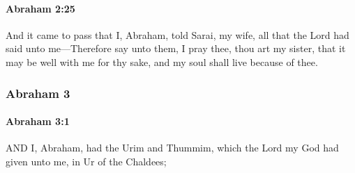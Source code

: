 		\paragraph{Abraham 2:25} %
			\label{ABRAHAM-2-25}

			And it came to pass that I, Abraham, told Sarai, my wife, all that the Lord had said unto me—Therefore say unto them, I pray thee, thou art my sister, that it may be well with me for thy sake, and my soul shall live because of thee.

		
	\subsubsection{Abraham 3} %
		\label{ABRAHAM-3}
		
		\paragraph{Abraham 3:1} %
			\label{ABRAHAM-3-1}

			AND I, Abraham, had the Urim and Thummim, which the Lord my God had given unto me, in Ur of the Chaldees;


